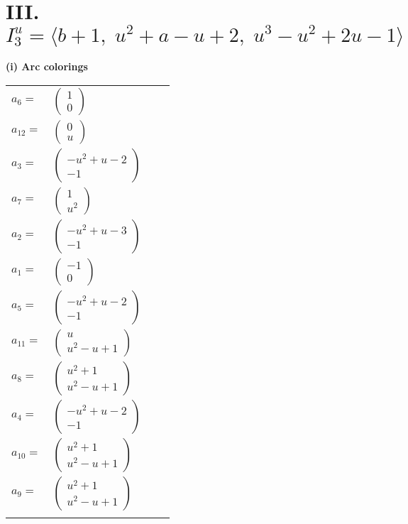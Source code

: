 \documentclass[1p]{elsarticle_modified}
\theoremstyle{definition}
\begin{document}
\centering \section*{III. $I^u_{3}= \langle b+1,\;u^2+a- u+2,\;u^3- u^2+2 u-1 \rangle$}
\flushleft \textbf{(i) Arc colorings}\\
\begin{tabular}{m{7pt} m{180pt} m{7pt} m{180pt} }
\flushright $a_{6}=$&$\begin{pmatrix}1\\0\end{pmatrix}$ \\
\flushright $a_{12}=$&$\begin{pmatrix}0\\u\end{pmatrix}$ \\
\flushright $a_{3}=$&$\begin{pmatrix}- u^2+u-2\\-1\end{pmatrix}$ \\
\flushright $a_{7}=$&$\begin{pmatrix}1\\u^2\end{pmatrix}$ \\
\flushright $a_{2}=$&$\begin{pmatrix}- u^2+u-3\\-1\end{pmatrix}$ \\
\flushright $a_{1}=$&$\begin{pmatrix}-1\\0\end{pmatrix}$ \\
\flushright $a_{5}=$&$\begin{pmatrix}- u^2+u-2\\-1\end{pmatrix}$ \\
\flushright $a_{11}=$&$\begin{pmatrix}u\\u^2- u+1\end{pmatrix}$ \\
\flushright $a_{8}=$&$\begin{pmatrix}u^2+1\\u^2- u+1\end{pmatrix}$ \\
\flushright $a_{4}=$&$\begin{pmatrix}- u^2+u-2\\-1\end{pmatrix}$ \\
\flushright $a_{10}=$&$\begin{pmatrix}u^2+1\\u^2- u+1\end{pmatrix}$ \\
\flushright $a_{9}=$&$\begin{pmatrix}u^2+1\\u^2- u+1\end{pmatrix}$\\&\end{tabular}
\end{document}
